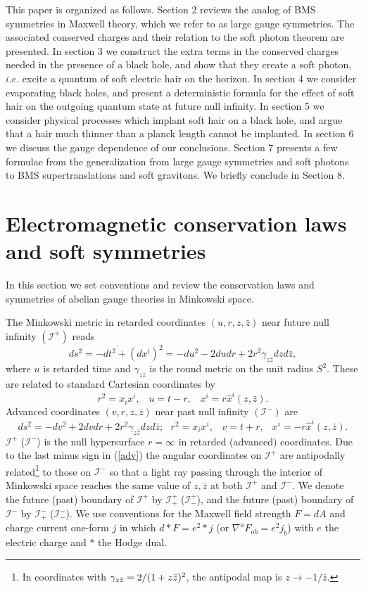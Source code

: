 \documentclass[12pt]{article}
\numberwithin{equation}{section}
\def\bz{{\bar z}}
\def\n{\nabla}
\newcommand{\be}{\begin{equation}}
\newcommand{\ee}{\end{equation}}
\begin{document}
This paper is organized as follows. Section 2 reviews the analog of BMS symmetries in Maxwell theory, which we refer to as large gauge symmetries. The associated conserved charges and their relation to the soft photon theorem are presented.  In section 3 we construct the extra terms in the conserved charges needed in the presence of a black hole,  and show that they create a soft photon, $i.e.$ excite a quantum of soft electric hair on the horizon. In section 4 we consider evaporating black holes, and present a deterministic formula for the effect of soft hair on the outgoing quantum state at future null infinity. In section 5 we consider physical processes which implant soft hair on a black hole, and argue that a hair much thinner than a planck length cannot be implanted. In section 6 we discuss the gauge dependence of our conclusions. Section 7 presents a few formulae from the generalization from large gauge symmetries and soft photons to BMS supertranslations and soft gravitons. We briefly conclude in Section 8. 


 
  
  
  

 




\section{Electromagnetic conservation laws and soft symmetries}
In this section we set conventions and review the conservation laws and symmetries of abelian gauge theories in Minkowski space. 

The Minkowski metric in retarded coordinates $(u,r,z, \bz)$ near future null infinity $(\mathcal{I}^+)$ reads
\be\label{ret}
ds^2=-dt^2+ (dx^i)^2=-du^2 -2du dr + 2r^2\gamma_{z\bz}dz d\bz,  
\ee
where $u$ is retarded time and $\gamma_{z\bz}$ is the round metric on the unit radius $S^2$. These are related to standard  Cartesian coordinates by
\be\label{ret}
r^2=x_ix^i, \;\;\; u=t-r, \;\;\; x^i=r\hat{x}^i(z, \bz).  
\ee 
Advanced coordinates $(v,r,z, \bz)$ near past null infinity $(\mathcal{I}^-)$ are\be\label{adv}
ds^2=-dv^2+2dvdr +2r^2\gamma_{z\bz}dz d\bz ;~~~r^2=x_ix^i, \;\;\; v=t+r, \;\;\ x^i=-r\hat{x}^i(z, \bz). 
\ee
$\mathcal{I}^+ $ ($\mathcal{I}^-$) is  the null hypersurface $r= \infty$ in retarded (advanced) coordinates.  
Due to the last minus sign in (\ref{adv}) the angular coordinates on $\mathcal{I}^+$ are antipodally related\footnote{In coordinates with $\gzz=2/(1+z\bz)^{2}$, the antipodal map is 
$z\to-1/\bz$.} to those on $\mathcal{I}^-$ so that a light ray  passing through the interior of Minkowski space reaches  the same value of $z, \bz$ at both $\mathcal{I}^+$ and $\mathcal{I}^-$. We denote the future (past) boundary of $\mathcal{I}^+$ by $\mathcal{I}^+_+$ ($\mathcal{I}^+_-$), and the future (past) boundary of $\mathcal{I}^-$ by $\mathcal{I}^-_{+}$ ($\mathcal{I}^-_{-}$).   
We use conventions for the Maxwell field strength $F=dA$  and charge current one-form $j$ in which $d*F=e^2*j$ (or $\n^aF_{ab}=e^2j_b$) with $e$ the electric charge and $*$ the Hodge dual. 
\end{document}
